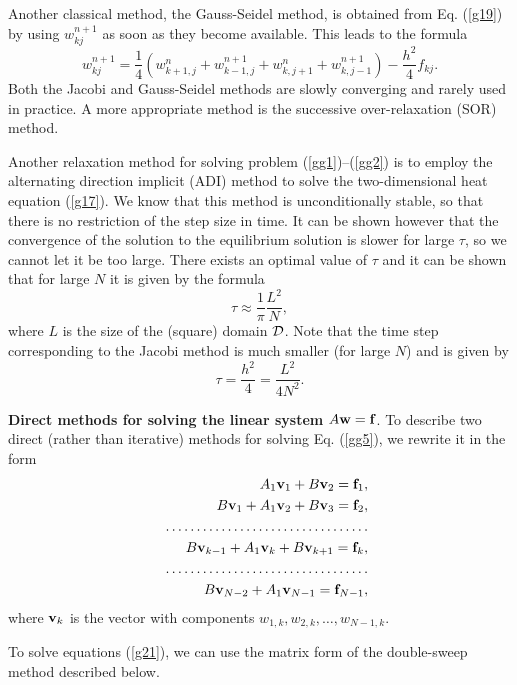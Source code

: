 \vskip 0.3cm  
Another classical method, the Gauss-Seidel method, is obtained from Eq. (\ref{g19})
by using $w_{kj}^{n+1}$ as soon as they become available. This leads to the formula
\begin{equation}
w_{kj}^{n+1}=\frac{1}{4}\left(w^{n}_{k+1,j}+w^{n+1}_{k-1,j}+w^{n}_{k,j+1}+w^{n+1}_{k,j-1}\right)
-\frac{h^2}{4}f_{kj}. \label{g20}
\end{equation}
Both the Jacobi and Gauss-Seidel methods are slowly converging and rarely used in practice.
A more appropriate method is the successive over-relaxation (SOR) method.

\vskip 0.3cm  
Another relaxation method for solving problem (\ref{gg1})--(\ref{gg2}) is to employ the alternating direction
implicit (ADI) method to solve the two-dimensional heat equation (\ref{g17}).
We know that this method is unconditionally stable, so that
there is no restriction of the step size in time. It can be shown however that the convergence of the
solution to the equilibrium solution is slower for large $\tau$, so we cannot let it be too large.
There exists an optimal value of $\tau$ and it can be shown that for large $N$ it is given by the formula
\[
\tau\approx\frac{1}{\pi}\frac{L^2}{N},
\]
where $L$ is the size of the (square) domain ${\cal D}$. Note that the time step corresponding
to the Jacobi method is much smaller (for large $N$) and is given by
\[
\tau=\frac{h^2}{4}=\frac{L^2}{4N^2}.
\]


\vskip 0.5cm  
{\bf Direct methods for solving the linear system}  $A{\bf w}={\bf f}$.
To describe two direct (rather than iterative) methods for solving Eq. (\ref{gg5}), we rewrite
it in the form
\begin{eqnarray}
&&A_{1}{\bf v}_{1}+B{\bf v}_{2}={\bf f}_{1}, \nonumber \\
&&B{\bf v}_{1}+A_{1}{\bf v}_{2}+B{\bf v}_{3}={\bf f}_{2}, \nonumber \\
&& \dots \dots \dots \dots \dots \dots \dots \dots \dots \dots \dots \nonumber \\
&&B{\bf v}_{k-1}+A_{1}{\bf v}_{k}+B{\bf v}_{k+1}={\bf f}_{k}, \nonumber \\
&& \dots \dots \dots \dots \dots \dots \dots \dots \dots \dots \dots \nonumber \\
&&B{\bf v}_{N-2}+A_{1}{\bf v}_{N-1}={\bf f}_{{N-1}}, \label{g21}
\end{eqnarray}
where ${\bf v}_{k}$ is the vector with components $w_{1,k},
w_{2,k}, \dots, w_{N-1,k}$.

\vskip 0.3cm  
To solve equations (\ref{g21}), we can use
the matrix form of the double-sweep method described below.

